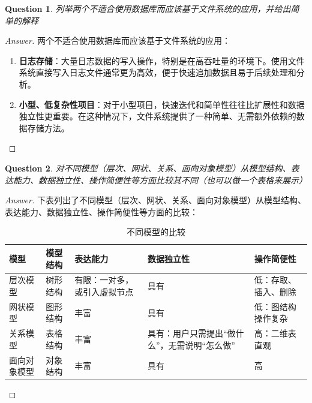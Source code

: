 \documentclass[UTF8,a4paper,10pt]{article}
\newtheorem{question}{Question}
\newenvironment{solution}
  {\begin{proof}[Answer]}
  {\end{proof}}
\begin{document}
	\begin{question}
	列举两个不适合使用数据库而应该基于文件系统的应用，并给出简单的解释
	\end{question}

	\begin{solution}
		两个不适合使用数据库而应该基于文件系统的应用：

	\begin{enumerate}
		\item \textbf{日志存储}：大量日志数据的写入操作，特别是在高吞吐量的环境下。使用文件系统直接写入日志文件通常更为高效，便于快速追加数据且易于后续处理和分析。
		\item \textbf{小型、低复杂性项目}：对于小型项目，快速迭代和简单性往往比扩展性和数据独立性更重要。在这种情况下，文件系统提供了一种简单、无需额外依赖的数据存储方法。
	\end{enumerate}
	\end{solution}

	\begin{question}
	对不同模型（层次、网状、关系、面向对象模型）从模型结构、表达能力、数据独立性、操作简便性等方面比较其不同（也可以做一个表格来展示） 
	\end{question}

	\begin{solution}
	下表列出了不同模型（层次、网状、关系、面向对象模型）从模型结构、表达能力、数据独立性、操作简便性等方面的比较：

	\begin{table}[H]
	\centering
	\caption{不同模型的比较}
	\begin{tabularx}{\textwidth}{lXXXX}
	\hline
	\textbf{模型} & \textbf{模型结构} & \textbf{表达能力} & \textbf{数据独立性} & \textbf{操作简便性} \\ \hline
	层次模型 & 树形结构 & 有限：一对多，或引入虚拟节点 & 具有 & 低：存取、插入、删除\\	\hline

	网状模型 & 图形结构 & 丰富 & 具有 & 低：图结构操作复杂 \\	\hline

	关系模型 & 表格结构 & 丰富 & 具有：用户只需提出“做什么”，无需说明“怎么做” & 高：二维表直观\\	\hline

	面向对象模型 & 对象结构 & 丰富 & 具有 & 高\\ \hline
	\end{tabularx}
	\end{table}

	\end{solution}
\end{document}
